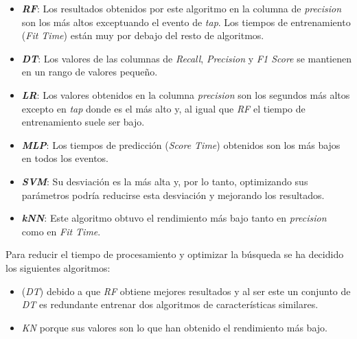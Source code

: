 \begin{itemize}
    \item \textbf{\textit{RF}}: Los resultados obtenidos por este algoritmo en la columna de \textit{precision} son los más altos exceptuando el evento de \textit{tap}. Los tiempos de entrenamiento (\textit{Fit Time}) están muy por debajo del resto de algoritmos.

    \item \textbf{\textit{DT}}: Los valores de las columnas de \textit{Recall}, \textit{Precision} y \textit{F1 Score} se mantienen en un rango de valores pequeño. 

    \item \textbf{\textit{LR}}: Los valores obtenidos en la columna \textit{precision} son los segundos más altos excepto en \textit{tap} donde es el más alto y, al igual que \textit{RF} el tiempo de entrenamiento suele ser bajo.
    
    \item \textbf{\textit{MLP}}: Los tiempos de predicción (\textit{Score Time}) obtenidos son los más bajos en todos los eventos.

    \item \textbf{\textit{SVM}}: Su desviación es la más alta y, por lo tanto, optimizando sus parámetros podría reducirse esta desviación y mejorando los resultados.

    \item \textbf{\textit{kNN}}: Este algoritmo obtuvo el rendimiento más bajo tanto en \textit{precision} como en \textit{Fit Time}.
\end{itemize}

Para reducir el tiempo de procesamiento y optimizar la búsqueda se ha decidido los siguientes algoritmos:
\begin{itemize}
    \item (\textit{DT}) debido a que \textit{RF} obtiene mejores resultados y al ser este un conjunto de \textit{DT} es redundante entrenar dos algoritmos de características similares. 
    \item \textit{KN} porque sus valores son lo que han obtenido el rendimiento más bajo.
\end{itemize}



